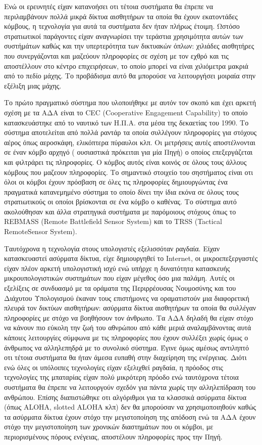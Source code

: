 Ενώ οι ερευνητές είχαν κατανοήσει οτι τέτοια συστήματα θα έπρεπε να περιλαμβάνουν πολλά μικρά δίκτυα αισθητήρων τα οποία θα έχουν εκατοντάδες κόμβους, η τεχνολογία
για αυτά τα συστήματα δεν ήταν πλήρως έτοιμη.
Ωστόσο στρατιωτικοί παράγοντες είχαν αναγνωρίσει την τεράστια χρησιμότητα αυτών των συστήμάτων καθώς και την υπερτερότητα των δικτυακών όπλων: χιλιάδες αισθητήρες που
συνεργάζονται και μαζεύουν πληροφορίες σε σχέση με τον εχθρό και τις αποστέλλουν στο κέντρο επιχειρήσεων, το οποίο μπορεί να είναι χιλιόμετρα μακριά από το πεδίο
μάχης.
Το προβάδισμα αυτό θα μπορούσε να λειτουργήσει μοιραία στην εξέλιξη μιας μάχης.

Το πρώτο πραγματικό σύστημα που υλοποιήθηκε με αυτόν τον σκοπό και έχει αρκετή σχέση με τα ΑΔΑ είναι το CEC (Cooperative Engagement Capability)\nocite{cec} το οποίο
κατασκευάστηκε από το ναυτικό των Η.Π.Α. στα μέσα της δεκαετίας του 1990.
Το σύστημα αποτελείται από πολλά ραντάρ τα οποία συλλέγουν πληροφορίες για στόχους αέρος όπως αεροσκάφη, ελικόπτερα πύραυλοι κλπ.
Οι μετρήσεις αυτές αποστέλνονται σε έναν κόμβο αρχηγό ( ουσιαστικά πρόκειται για μία Πηγή) ο οποίος επεξεργάζεται και φιλτράρει τις πληροφορίες.
Ο κόμβος αυτός είναι κοινός σε όλους τους άλλους κόμβους που μαζεουν πληροφορίες.
Το σημαντικό στοιχείο του σηστήματος είναι οτι όλοι οι κόμβοι έχουν πρόσβαση σε όλες τις πληροφορίες δημιουργώντας ένα πραγματικά κατανεμημένο σύστημα το οποίο δίνει
την ίδια εκόνα σε όλους τους στρατιωτικούς οι οποίοι βρίσκονται σε ένα κόμβο ο καθένας. Το σύστημα αυτό ακολούθησαν και άλλα στρατηγικά συστήματα με παρόμοιους
στόχους όπως το REΒMASS (Remote Battlefield Sensor System) και το TRSS (Tactical RemoteSensor System).


Ταυτόχρονα η τεχνολογία στους υπολογιστές εξελισσόταν ραγδαία.
Είχαν κατασκευαστεί ασύρματα δίκτυα, είχε δημιουργηθεί το Internet, οι μικροεπεξεργαστές είχαν πλέον αρκετή υπολογιστική ισχύ ενώ υπήρχε η δυνατότητα κατασκευής
μικρουπολογιστικών συστημάτων που είχαν μέγεθος όσο μια παλάμη.
Αυτές οι εξελίξεις σε συνδυασμό με τα οράματα της Περιρρέουσας Νουμοσύνης και του Διάχυτου Υπολογισμού έκαναν τους επιστήμονες να οραματιστούν μια διαφορετική πλευρά
τον δικτύων αισθητήρων: ασύρματα δίκτυα αισθητήρων τα οποία θα συλλέγαν πληροφορίες με στόχο να βοηθήσουν τον άνθρωπο.
Τα ΑΔΑ δηλαδή θα είχαν στόχο να κάνουν πιο εύκολη την ζωή του αθνρώπου από κάθε μεριά αναλαμβάνοντας αυτά κάποιες λειτουργίες σύμφωνα με τις πληροφορίες που έχουν
συλλέξει χωρίς όμως ο άνθρωπος να αλληλεπηδρά με το συνολικό σύστημα.
Έγινε όμως αμέσως αντιληπτό οτι τέτοια συστήματα θα ήταν άμεσα ευπαθή στην διαχείρηση της ενέργειας.
Διότι ενώ όλες οι υπόλοιπες τεχνολογίες είχαν εξελιχθεί ραγδαία, η πρόοδος στις τεχνολογίες της μπαταρίας είχαν πολύ μικρότερη πρόοδο ενώ ταυτόχρονα τέτοια συστήματα
θα έπρεπε να λειτουργούν σχεδόν για πάντα χωρίς την αλληλεπίδραση του ανθρώπου.
Επίσης διαπιστώθηκε οτι αλγόριθμοι για τα κλασσικά ασύρματα δίκτυα (όπως ALOHA, slotted ALOHA κλπ) δεν θα μπορούσαν να χρησιμοποιηθούν καθώς τα ασύρματα δίκτυα έχουν
στόχο την μεγιστοποίηση της απόδοση ενώ τα ΑΔΑ έχουν στόχο την μεγιστοποίηση των χρονικών διαστημάτων που οι κόμβοι, με περιορισμένους πόρους ενέγειας, αποστέλουν
πληροφορίες προς την Πηγή.

